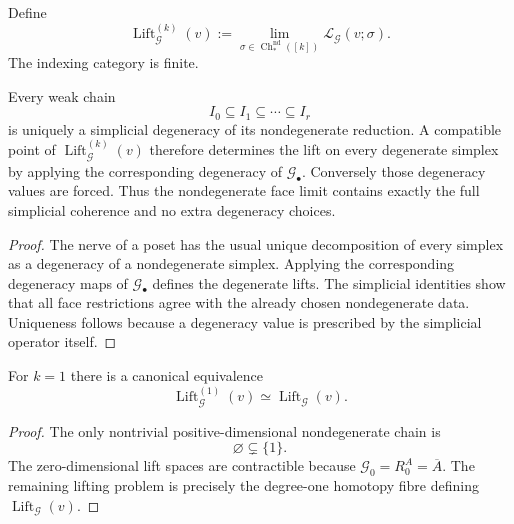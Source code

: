 \begin{definition}
\label{def:symmetry-noether-coherent-symmetry-lift-of-a-cube}
Define
\[
\boxed{
\operatorname{Lift}^{(k)}_{\mathcal G}(v)
:=
\lim_{\sigma\in\operatorname{Ch}^{\mathrm{nd}}_*([k])}
\mathcal L_{\mathcal G}(v;\sigma).
}
\]
The indexing category is finite.
\end{definition}

\begin{proposition}
\label{prop:symmetry-noether-degenerate-simplices-carry-no-independent-lift-data}
Every weak chain
\[
I_0\subseteq I_1\subseteq\cdots\subseteq I_r
\]
is uniquely a simplicial degeneracy of its nondegenerate reduction.  A compatible
point of $\operatorname{Lift}^{(k)}_{\mathcal G}(v)$ therefore determines the lift
on every degenerate simplex by applying the corresponding degeneracy of
$\mathcal G_\bullet$.  Conversely those degeneracy values are forced.  Thus the
nondegenerate face limit contains exactly the full simplicial coherence and no
extra degeneracy choices.
\end{proposition}

\begin{proof}
The nerve of a poset has the usual unique decomposition of every simplex as a
degeneracy of a nondegenerate simplex.  Applying the corresponding degeneracy maps
of $\mathcal G_\bullet$ defines the degenerate lifts.  The simplicial identities
show that all face restrictions agree with the already chosen nondegenerate data.
Uniqueness follows because a degeneracy value is prescribed by the simplicial
operator itself.
\end{proof}

\begin{proposition}
\label{prop:symmetry-noether-recovery-of-the-one-stage-lift}
For $k=1$ there is a canonical equivalence
\[
\operatorname{Lift}^{(1)}_{\mathcal G}(v)
\simeq
\operatorname{Lift}_{\mathcal G}(v).
\]
\end{proposition}

\begin{proof}
The only nontrivial positive-dimensional nondegenerate chain is
\[
\varnothing\subsetneq\{1\}.
\]
The zero-dimensional lift spaces are contractible because
$\mathcal G_0=R^A_0=\overline A$.  The remaining lifting problem is precisely the
degree-one homotopy fibre defining $\operatorname{Lift}_{\mathcal G}(v)$.
\end{proof}

